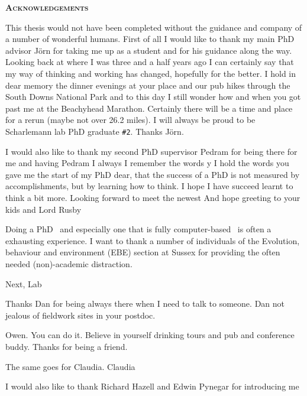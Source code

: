 \pagestyle{empty}%
%

\bigskip

\begin{center}
	\Huge \textsc{\textbf{Acknowledgements}}
\end{center}

This thesis would not have been completed without the guidance and company of a number of wonderful humans. First of all I would like to thank my main PhD advisor J\"{o}rn for taking me up as a student and for his guidance along the way. Looking back at where I was three and a half years ago I can certainly say that my way of thinking and working has changed, hopefully for the better. I hold in dear memory the dinner evenings at your place and our pub hikes through the South Downs National Park and to this day I still wonder how and when you got past me at the Beachyhead Marathon. Certainly there will be a time and place for a rerun (maybe not over 26.2 miles). I will always be proud to be Scharlemann lab PhD graduate \texttt{\#2}. Thanks J\"{o}rn.

I would also like to thank my second PhD supervisor Pedram for being there for me and having 
Pedram
I always
I remember the words y
I hold the words you gave me the start of my PhD dear, that the success of a PhD is not measured by accomplishments, but by learning how to think.
I hope I have succeed learnt to think a bit more.
Looking forward to meet the newest 
And hope greeting to your kids and Lord Rusby

Doing a PhD \textendash\ and especially one that is fully computer-based \textendash\ is often a exhausting experience. I want to thank a number of individuals of the Evolution, behaviour and environment (EBE) section at Sussex for providing the often needed (non)-academic distraction. 

Next, Lab 

Thanks Dan for being always there when I need to talk to someone. 
Dan
not jealous of fieldwork sites in your postdoc. 

Owen. 
You can do it. Believe in yourself
drinking tours and pub and conference buddy.
Thanks for being a friend.

The same goes for Claudia.
Claudia

I would also like to thank Richard Hazell and Edwin Pynegar for introducing me

